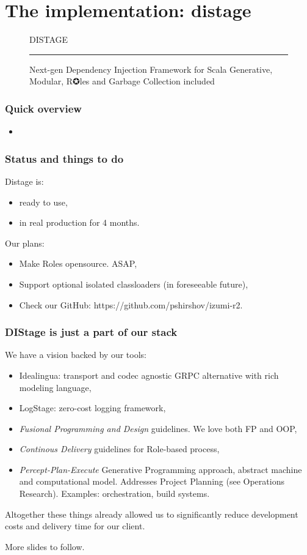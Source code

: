 \documentclass[usenames,dvipsnames]{beamer}
\begin{document}
\section{The implementation: distage}

\begin{frame}
\begin{figure}
\Huge 
\color{RubineRed} DISTAGE
\noindent
{\color{RubineRed} \rule{\linewidth}{1mm} }
\Large Next-gen Dependency Injection Framework for Scala
\normalsize Generative, Modular, R✪les and Garbage Collection included 
\end{figure}
\end{frame}

\begin{frame}
\frametitle{Quick overview}
\begin{itemize}
\item 
\end{itemize}
\end{frame}

\begin{frame}
\frametitle{Status and things to do}
Distage is:
\begin{itemize}
\item ready to use,
\item in real production for 4 months.
\end{itemize}
\vspace{0.3cm}
Our plans:
\begin{itemize}
\item Make Roles opensource. ASAP,
\item Support optional isolated classloaders (in foreseeable future),
\item Check our GitHub: https://github.com/pshirshov/izumi-r2.
\end{itemize}
\end{frame}

\begin{frame}
\frametitle{DIStage is just a part of our stack}
We have a vision backed by our tools:
\begin{itemize}
\item Idealingua: transport and codec agnostic GRPC alternative with rich modeling language,
\item LogStage: zero-cost logging framework,
\item \textit{Fusional Programming and Design} guidelines. We love both FP and OOP,
\item \textit{Continous Delivery} guidelines for Role-based process, 
\item \textit{Percept-Plan-Execute} Generative Programming approach, abstract machine and computational model.
Addresses Project Planning (see Operations Research). Examples: orchestration, build systems.
\end{itemize}

Altogether these things already allowed us to significantly reduce development costs and
delivery time for our client.\newline

More slides to follow.
\end{frame}
\end{document}
